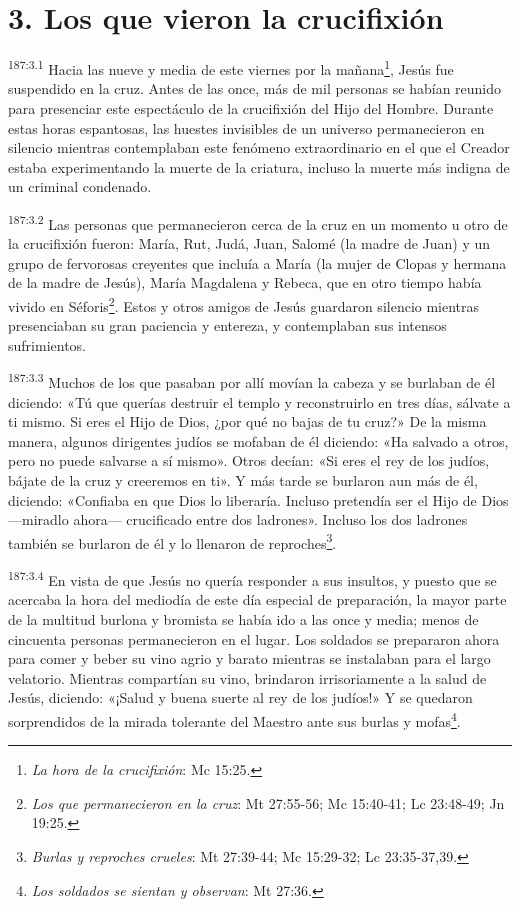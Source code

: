 \section*{3. Los que vieron la crucifixión}
\par
\textsuperscript{187:3.1} Hacia las nueve y media de este viernes por la mañana\footnote{\textit{La hora de la crucifixión}: Mc 15:25.}, Jesús fue suspendido en la cruz. Antes de las once, más de mil personas se habían reunido para presenciar este espectáculo de la crucifixión del Hijo del Hombre. Durante estas horas espantosas, las huestes invisibles de un universo permanecieron en silencio mientras contemplaban este fenómeno extraordinario en el que el Creador estaba experimentando la muerte de la criatura, incluso la muerte más indigna de un criminal condenado.

\par
\textsuperscript{187:3.2} Las personas que permanecieron cerca de la cruz en un momento u otro de la crucifixión fueron: María, Rut, Judá, Juan, Salomé (la madre de Juan) y un grupo de fervorosas creyentes que incluía a María (la mujer de Clopas y hermana de la madre de Jesús), María Magdalena y Rebeca, que en otro tiempo había vivido en Séforis\footnote{\textit{Los que permanecieron en la cruz}: Mt 27:55-56; Mc 15:40-41; Lc 23:48-49; Jn 19:25.}. Estos y otros amigos de Jesús guardaron silencio mientras presenciaban su gran paciencia y entereza, y contemplaban sus intensos sufrimientos.

\par
\textsuperscript{187:3.3} Muchos de los que pasaban por allí movían la cabeza y se burlaban de él diciendo: «Tú que querías destruir el templo y reconstruirlo en tres días, sálvate a ti mismo. Si eres el Hijo de Dios, ¿por qué no bajas de tu cruz?» De la misma manera, algunos dirigentes judíos se mofaban de él diciendo: «Ha salvado a otros, pero no puede salvarse a sí mismo». Otros decían: «Si eres el rey de los judíos, bájate de la cruz y creeremos en ti». Y más tarde se burlaron aun más de él, diciendo: «Confiaba en que Dios lo liberaría. Incluso pretendía ser el Hijo de Dios ---miradlo ahora--- crucificado entre dos ladrones». Incluso los dos ladrones también se burlaron de él y lo llenaron de reproches\footnote{\textit{Burlas y reproches crueles}: Mt 27:39-44; Mc 15:29-32; Lc 23:35-37,39.}.

\par
\textsuperscript{187:3.4} En vista de que Jesús no quería responder a sus insultos, y puesto que se acercaba la hora del mediodía de este día especial de preparación, la mayor parte de la multitud burlona y bromista se había ido a las once y media; menos de cincuenta personas permanecieron en el lugar. Los soldados se prepararon ahora para comer y beber su vino agrio y barato mientras se instalaban para el largo velatorio. Mientras compartían su vino, brindaron irrisoriamente a la salud de Jesús, diciendo: «¡Salud y buena suerte al rey de los judíos!» Y se quedaron sorprendidos de la mirada tolerante del Maestro ante sus burlas y mofas\footnote{\textit{Los soldados se sientan y observan}: Mt 27:36.}.

